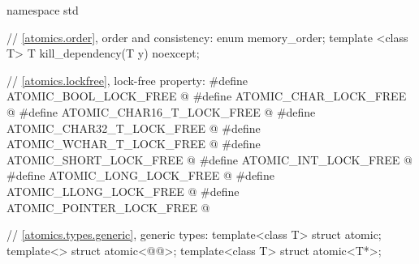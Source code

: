 %
\begin{codeblock}
namespace std {
  // \ref{atomics.order}, order and consistency:
  enum memory_order;
  template <class T>
    T kill_dependency(T y) noexcept;

  // \ref{atomics.lockfree}, lock-free property:
  #define ATOMIC_BOOL_LOCK_FREE @\unspec@
  #define ATOMIC_CHAR_LOCK_FREE @\unspec@
  #define ATOMIC_CHAR16_T_LOCK_FREE @\unspec@
  #define ATOMIC_CHAR32_T_LOCK_FREE @\unspec@
  #define ATOMIC_WCHAR_T_LOCK_FREE @\unspec@
  #define ATOMIC_SHORT_LOCK_FREE @\unspec@
  #define ATOMIC_INT_LOCK_FREE @\unspec@
  #define ATOMIC_LONG_LOCK_FREE @\unspec@
  #define ATOMIC_LLONG_LOCK_FREE @\unspec@
  #define ATOMIC_POINTER_LOCK_FREE @\unspec@

  // \ref{atomics.types.generic}, generic types:
  template<class T> struct atomic;
  template<> struct atomic<@@>;
  template<class T> struct atomic<T*>;

}
\end{codeblock}
